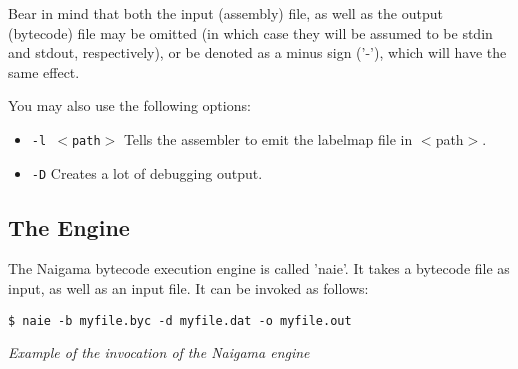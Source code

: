 Bear in mind that both the input (assembly) file, as well as the
output (bytecode) file may be omitted (in which case they will be
assumed to be stdin and stdout, respectively), or be denoted as
a minus sign ('-'), which will have the same effect.

You may also use the following options:

\begin{itemize}
\item \texttt{-l $<$path$>$} Tells the assembler to emit the labelmap
      file in $<$path$>$.
\item \texttt{-D} Creates a lot of debugging output.
\end{itemize}

\subsection{The Engine}

The Naigama bytecode execution engine is called 'naie'.
It takes a bytecode file as input, as well as an input file.
It can be invoked as follows:

\begin{myquote}
\begin{verbatim}
$ naie -b myfile.byc -d myfile.dat -o myfile.out

\end{verbatim}
\end{myquote}
\textit{Example of the invocation of the Naigama engine}

